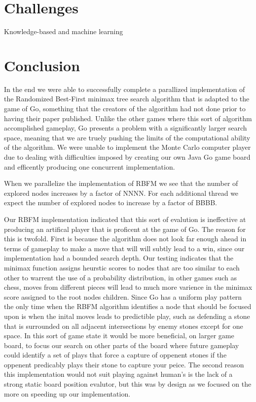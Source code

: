 \documentclass[conference]{IEEEtran}
\begin{document}
\section{Challenges}

Knowledge-based and machine learning

\section{Conclusion}
In the end we were able to successfully complete a parallized implementation of the Randomized Best-First minimax tree search algorithm that is adapted to the game of Go, something that the creators of the algorithm had not done prior to having their paper published. Unlike the other games where this sort of algorithm accomplished gameplay, Go presents a problem with a significantly larger search space, meaning that we are truely pushing the limits of the computational ability of the algorithm. We were unable to implement the Monte Carlo computer player due to dealing with difficulties imposed by creating our own Java Go game board and efficently producing one concurrent implementation.\par
When we parallelize the implementation of RBFM we see that the number of explored nodes increases by a factor of NNNN. For each additional thread we expect the number of explored nodes to increase by a factor of BBBB. \par
Our RBFM implementation indicated that this sort of evalution is ineffective at producing an artifical player that is proficent at the game of Go. The reason for this is twofold. First is because the algorithm does not look far enough ahead in terms of gameplay to make a move that will will subtly lead to a win, since our implementation had a bounded search depth. Our testing indicates that the minimax function assigns heurstic scores to nodes that are too similar to each other to warrent the use of a probability distribution, in other games such as chess, moves from different pieces will lead to much more varience in the minimax score assigned to the root nodes children. Since Go has a uniform play pattern the only time when the RBFM algorithm identifies a node that should be focused upon is when the inital moves leads to predictible play, such as defending a stone that is surrounded on all adjacent intersections by enemy stones except for one space. In this sort of game state it would be more beneficial, on larger game board, to focus our search on other parts of the board where future gameplay could identify a set of plays that force a capture of oppenent stones if the oppenent predicably plays their stone to capture your peice. The second reason this implementation would not suit playing against human's is the lack of a strong static board position evalutor, but this was by design as we focused on the more on speeding up our implementation.\par
\end{document}

